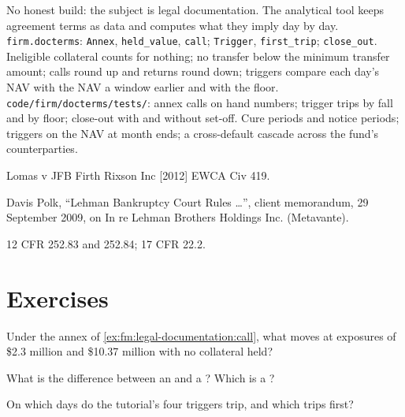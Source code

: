 \begin{build}
 No honest build: the subject is legal documentation. The analytical tool keeps agreement terms as data and computes what they
imply day by day.
 \texttt{firm.docterms}: \texttt{Annex}, \texttt{held\_value}, \texttt{call}; \texttt{Trigger}, \texttt{first\_trip};
\texttt{close\_out}.
 Ineligible collateral counts for nothing; no transfer below the minimum transfer amount; calls round up and returns round down;
triggers compare each day's NAV with the NAV a window earlier and with the floor.
 \texttt{code/firm/docterms/tests/}: annex calls on hand numbers; trigger trips by fall and by floor; close-out with and
without set-off.
 Cure periods and notice periods; triggers on the NAV at month ends; a cross-default cascade across the fund's counterparties.
\end{build}

\begin{omsources}
\item Lomas v JFB Firth Rixson Inc [2012] EWCA Civ 419.
\item Davis Polk, ``Lehman Bankruptcy Court Rules \dots'', client memorandum, 29 September 2009, on In re Lehman Brothers Holdings Inc.
(Metavante).
\item 12 CFR 252.83 and 252.84; 17 CFR 22.2.
\end{omsources}

\section{Exercises}

\begin{exercise}[$\star$]\label{exo:fm:legal-documentation:1}
Under the annex of \cref{ex:fm:legal-documentation:call}, what moves at exposures of \$2.3 million and \$10.37 million with no collateral held?
\end{exercise}

\begin{exercise}[$\star$]\label{exo:fm:legal-documentation:2}
What is the difference between an  and a ? Which is a ?
\end{exercise}

\begin{exercise}[$\star$]\label{exo:fm:legal-documentation:3}
On which days do the tutorial's four triggers trip, and which trips first?
\end{exercise}

